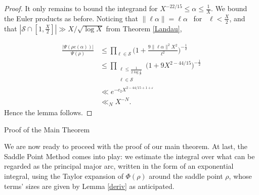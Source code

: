\documentclass[12pt,reqno]{amsart}
\makeatletter
\def\section{\@startsection{section}{1}
  \z@{.7\linespacing\@plus\linespacing}{.5\linespacing}
  {\normalfont\scshape\bfseries}}
\makeatother
\begin{document}
\begin{proof}
It only remains to bound the integrand for $X^{-22/15} \leq  \alpha \leq \frac{1}{X}$. We bound the Euler products as before. Noticing that $\|\ell\alpha\|=\ell\alpha $ \ for \ $ \ell<\frac{X}{2}$, and that $|\mathcal{S}\cap[1,\frac{X}{2}]|\gg X/\sqrt{\log X}$ from Theorem \ref{Landau},

\begin{align*}
    \frac{|\Psi(\rho e(\alpha))|}{\Psi(\rho)}& \leq \prod_{ \ell\in \mathcal{S}} \Bigg(1+\frac{9\|\ell\alpha\|^2X^2}{\ell^2}\Bigg)^{-\frac{1}{2}}\\
    & \leq \prod_{\substack{ \ell\leq \frac{1}{2\log \frac{1}{\rho}}\\ \ell \in \mathcal{S}}} \Bigg(1+9 X^{2-44/15}\Bigg)^{-\frac{1}{2}}\\
    & \ll e^{-c_2 X^{2-44/15+1+\varepsilon}}\\
    & \ll_N X^{-N}.
\end{align*}
  Hence the lemma follows.
\end{proof}

\section{Proof of the Main Theorem}\label{proofmain}

We are now ready to proceed with the proof of our main theorem. At last, the Saddle Point Method comes into play: we estimate the integral over what can be regarded as the principal major arc, written in the form of an exponential integral, using the Taylor expansion of $\Phi(\rho)$ around the saddle point $\rho$, whose terms' sizes are given by Lemma \ref{deriv} as anticipated.
\end{document}
